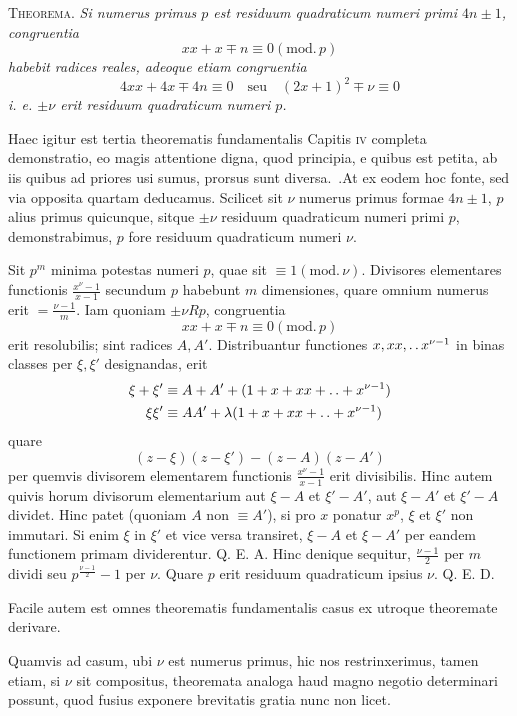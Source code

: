 \textsc{Theorema.} \emph{Si numerus primus $p$ est residuum quadraticum numeri primi $4n\pm1$, congruentia}
\[
xx+x\mp n\equiv0(\mathrm{mod.}\,p)
\]
\emph{habebit radices reales, adeoque etiam congruentia}
\[
4xx+4x\mp4n\equiv0\quad\text{seu}\quad(2x+1)^2\mp\nu\equiv0
\]
\emph{i. e. $\pm\nu$ erit residuum quadraticum numeri $p$.}

Haec igitur est tertia theorematis fundamentalis Capitis \textsc{iv} completa demonstratio, eo magis attentione digna, quod principia, e quibus est petita, ab iis quibus ad priores usi sumus, prorsus sunt diversa.\ .At ex eodem hoc fonte, sed via opposita quartam deducamus. Scilicet sit $\nu$ numerus primus formae $4n\pm1$, $p$ alius primus quicunque, sitque $\pm\nu$ residuum quadraticum numeri primi $p$, demonstrabimus, $p$ fore residuum quadraticum numeri $\nu$.

Sit $p^m$ minima potestas numeri $p$, quae sit $\equiv1(\mathrm{mod.}\,\nu)$. Divisores elementares functionis $\frac{x^\nu-1}{x-1}$ secundum $p$ habebunt $m$ dimensiones, quare omnium numerus erit $=\frac{\nu-1}m$. Iam quoniam $\pm\nu Rp$, congruentia
\[
xx+x\mp n\equiv0(\mathrm{mod.}\,p)
\]
erit resolubilis; sint radices $A,A'$. Distribuantur functiones $x,xx,\mathinner{.\,.} x^{\nu-1}$ in binas classes per $\xi,\xi'$ designandas, erit
%
\[
\begin{aligned}
\xi+\xi'&\equiv A+A'+(1+x+xx+\mathinner{.\,.}+x^{\nu-1})\\
\xi\xi'&\equiv AA'+\lambda(1+x+xx+\mathinner{.\,.}+x^{\nu-1})
\end{aligned}
\]
quare
\[
(z-\xi)(z-\xi')-(z-A)(z-A')
\]
per quemvis divisorem elementarem functionis $\frac{x^\nu-1}{x-1}$ erit divisibilis. Hinc autem quivis horum divisorum elementarium aut $\xi-A$ et $\xi'-A'$, aut $\xi-A'$ et $\xi'-A$ dividet. Hinc patet (quoniam $A$ non $\equiv A'$), si pro $x$ ponatur $x^p$, $\xi$ et $\xi'$ non immutari. Si enim $\xi$ in $\xi'$ et vice versa transiret, $\xi-A$ et $\xi-A'$ per eandem functionem primam dividerentur. Q. E. A. Hinc denique sequitur, $\frac{\nu-1}2$ per $m$ dividi seu $p^{\frac{\nu-1}2}-1$ per $\nu$. Quare $p$ erit residuum quadraticum ipsius $\nu$. Q. E. D.

Facile autem est omnes theorematis fundamentalis casus ex utroque theoremate derivare.

Quamvis ad casum, ubi $\nu$ est numerus primus, hic nos restrinxerimus, tamen etiam, si $\nu$ sit compositus, theoremata analoga haud magno negotio determinari possunt, quod fusius exponere brevitatis gratia nunc non licet.

